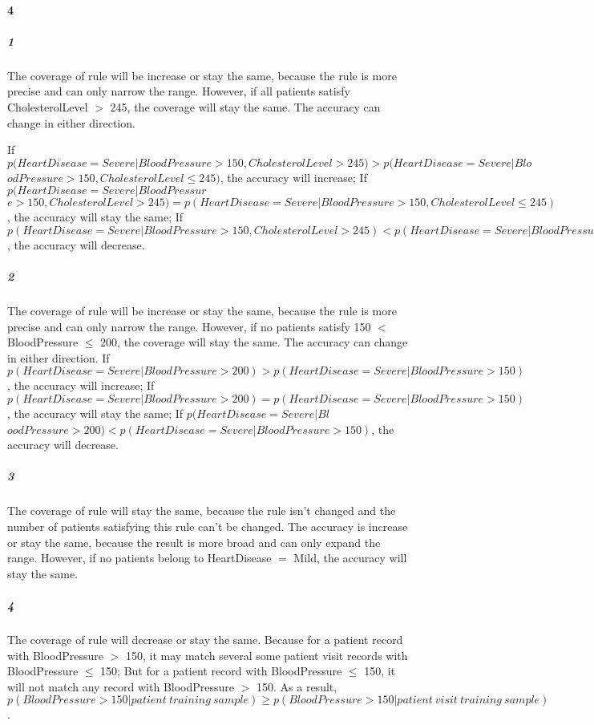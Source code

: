 \documentclass[22pt]{article}
\begin{document}
	\paragraph{4} 
		\subparagraph{1} The coverage of rule will be increase or stay the same, because the rule is more precise and can only narrow the range. However, if all patients satisfy CholesterolLevel $>$ 245, the coverage will stay the same. The accuracy can change in either direction.

		 If $p(HeartDisease=Severe|BloodPressure > 150,CholesterolLevel > 245)>p( HeartDisease=Severe|Blo$\\ $odPressure > 150,CholesterolLevel \leq 245)$, the accuracy will increase; If $p( HeartDisease=Severe|BloodPressur$\\ $e > 150,CholesterolLevel > 245) = p( HeartDisease=Severe|BloodPressure > 150,CholesterolLevel \leq 245)$, the accuracy will stay the same; If $p( HeartDisease=Severe|BloodPressure > 150,CholesterolLevel > 245)<p( HeartDisease=Severe|BloodPressure > 150,CholesterolLevel \leq 245)$, the accuracy will decrease.

		 \subparagraph{2} The coverage of rule will be increase or stay the same, because the rule is more precise and can only narrow the range. However, if no patients satisfy 150 $<$ BloodPressure $\leq$ 200, the coverage will stay the same. The accuracy can change in either direction. If $p(HeartDisease=Severe|BloodPressure > 200) >p(HeartDisease=Severe|BloodPressure > 150)$, the accuracy will increase; If $p(HeartDisease=Severe|BloodPressure > 200) = p(HeartDisease=Severe|BloodPressure > 150)$, the accuracy will stay the same; If $p(HeartDisease=Severe|Bl$\\ $oodPressure > 200) < p(HeartDisease=Severe|BloodPressure > 150)$, the accuracy will decrease.

		 \subparagraph{3} The coverage of rule will stay the same, because the rule isn't changed and the number of patients satisfying this rule can't be changed. The accuracy is increase or stay the same, because the result is more broad and can only expand the range. However, if no patients belong to HeartDisease $=$ Mild, the accuracy will stay the same.

		 \subparagraph{4}The coverage of rule will decrease or stay the same. Because for a patient record with 
		 BloodPressure $>$ 150, it may match several some patient visit records with BloodPressure $\leq$ 150; But for a patient record with BloodPressure $\leq$ 150, it will not match any record with BloodPressure $>$ 150. As a result, $p(BloodPressure > 150|patient\ training\ sample) \geq p(BloodPressure > 150| patient\ visit\ training\ sample)$. 
\end{document}
